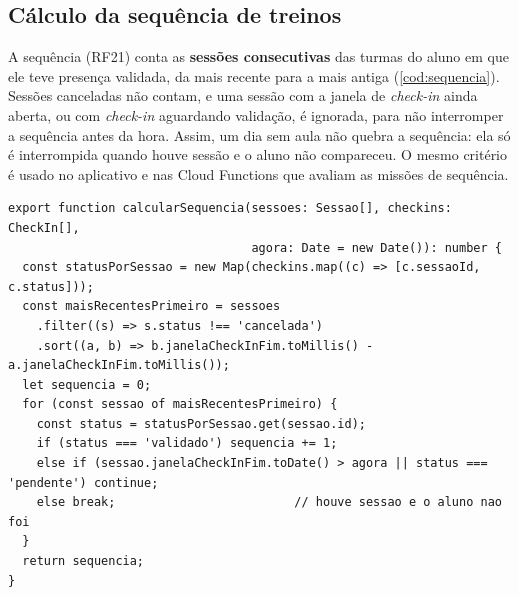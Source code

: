 \subsection{Cálculo da sequência de treinos}

A sequência (RF21) conta as \textbf{sessões consecutivas} das turmas do
aluno em que ele teve presença validada, da mais recente para a mais
antiga (\autoref{cod:sequencia}). Sessões canceladas não contam, e uma
sessão com a janela de \textit{check-in} ainda aberta, ou com
\textit{check-in} aguardando validação, é ignorada, para não interromper a
sequência antes da hora. Assim, um dia sem aula não quebra a sequência:
ela só é interrompida quando houve sessão e o aluno não compareceu. O
mesmo critério é usado no aplicativo e nas Cloud Functions que avaliam as
missões de sequência.

\begin{codigo}[!htb]
  \caption{Cálculo da sequência de treinos por sessão (TypeScript)}
  \label{cod:sequencia}
\begin{lstlisting}
export function calcularSequencia(sessoes: Sessao[], checkins: CheckIn[],
                                  agora: Date = new Date()): number {
  const statusPorSessao = new Map(checkins.map((c) => [c.sessaoId, c.status]));
  const maisRecentesPrimeiro = sessoes
    .filter((s) => s.status !== 'cancelada')
    .sort((a, b) => b.janelaCheckInFim.toMillis() - a.janelaCheckInFim.toMillis());
  let sequencia = 0;
  for (const sessao of maisRecentesPrimeiro) {
    const status = statusPorSessao.get(sessao.id);
    if (status === 'validado') sequencia += 1;
    else if (sessao.janelaCheckInFim.toDate() > agora || status === 'pendente') continue;
    else break;                         // houve sessao e o aluno nao foi
  }
  return sequencia;
}
\end{lstlisting}
\end{codigo}

